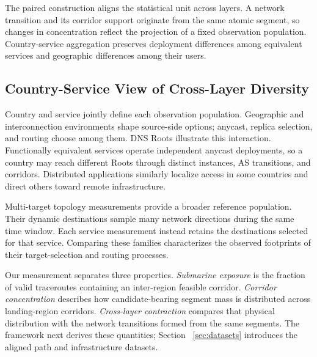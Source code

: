 The paired construction aligns the statistical unit across layers. A network
transition and its corridor support originate from the same atomic segment,
so changes in concentration reflect the projection of a fixed observation
population. Country-service aggregation preserves deployment differences
among equivalent services and geographic differences among their users.

\subsection{Country-Service View of Cross-Layer Diversity}
\label{sec:background_motivation}

Country and service jointly define each observation population. Geographic and
interconnection environments shape source-side options; anycast, replica
selection, and routing choose among them. DNS Roots illustrate this
interaction. Functionally equivalent services operate independent anycast
deployments, so a country may reach different Roots through distinct
instances, AS transitions, and corridors. Distributed applications similarly
localize access in some countries and direct others toward remote
infrastructure.

Multi-target topology measurements provide a broader reference population.
Their dynamic destinations sample many network directions during the same
time window. Each service measurement instead retains the destinations
selected for that service. Comparing these families characterizes the
observed footprints of their target-selection and routing processes.

Our measurement separates three properties. \emph{Submarine exposure} is the
fraction of valid traceroutes containing an inter-region feasible corridor.
\emph{Corridor concentration} describes how candidate-bearing segment mass is
distributed across landing-region corridors. \emph{Cross-layer contraction}
compares that physical distribution with the network transitions formed from
the same segments. The framework next derives these quantities; Section
~\ref{sec:datasets} introduces the aligned path and infrastructure datasets.
